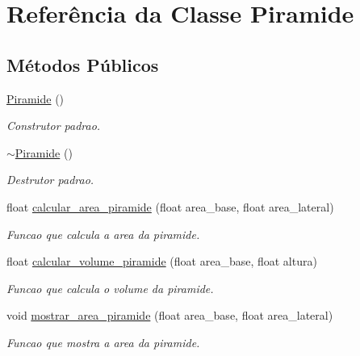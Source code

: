 \hypertarget{classPiramide}{}\section{Referência da Classe Piramide}
\label{classPiramide}
\subsection*{Métodos Públicos}
\begin{DoxyCompactItemize}
\item 
\mbox{\label{classPiramide_adfdf121c3906929a4971bec00b05afa2}} 
\hyperlink{classPiramide_adfdf121c3906929a4971bec00b05afa2}{Piramide} ()
\begin{DoxyCompactList}\small\item\em Construtor padrao. \end{DoxyCompactList}\item 
\mbox{\label{classPiramide_a1fdd51b594ba1fe14e094c7f1a6e5e79}} 
\hyperlink{classPiramide_a1fdd51b594ba1fe14e094c7f1a6e5e79}{$\sim$\+Piramide} ()
\begin{DoxyCompactList}\small\item\em Destrutor padrao. \end{DoxyCompactList}\item 
float \hyperlink{classPiramide_af728486b416f8613534458aa23d5f829}{calcular\+\_\+area\+\_\+piramide} (float area\+\_\+base, float area\+\_\+lateral)
\begin{DoxyCompactList}\small\item\em Funcao que calcula a area da piramide. \end{DoxyCompactList}\item 
float \hyperlink{classPiramide_a610ee9556dc701e27f8fc1efdd6d17c1}{calcular\+\_\+volume\+\_\+piramide} (float area\+\_\+base, float altura)
\begin{DoxyCompactList}\small\item\em Funcao que calcula o volume da piramide. \end{DoxyCompactList}\item 
void \hyperlink{classPiramide_a7d29435cac0fb807ab2584acc7806fe6}{mostrar\+\_\+area\+\_\+piramide} (float area\+\_\+base, float area\+\_\+lateral)
\begin{DoxyCompactList}\small\item\em Funcao que mostra a area da piramide. \end{DoxyCompactList}\item 

\end{DoxyCompactItemize}

